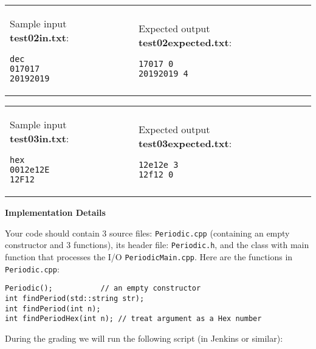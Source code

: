 \documentclass[11pt]{article}
\begin{document}
\vspace{10pt}



\begin{tabular}{@{}ll@{}}
\begin{minipage}[t]{0.49\columnwidth}
Sample input {\bf test02in.txt}:
\begin{verbatim}
dec
017017
20192019
\end{verbatim}
\end{minipage} 
&
\begin{minipage}[t]{0.49\columnwidth}
Expected output {\bf test02expected.txt}:
\begin{verbatim}
17017 0
20192019 4
\end{verbatim}
\end{minipage} 
\end{tabular}

\vspace{10pt}



\begin{tabular}{@{}ll@{}}
\begin{minipage}[t]{0.49\columnwidth}
Sample input {\bf test03in.txt}:
\begin{verbatim}
hex
0012e12E
12F12
\end{verbatim}
\end{minipage} 
&
\begin{minipage}[t]{0.49\columnwidth}
Expected output {\bf test03expected.txt}:
\begin{verbatim}
12e12e 3
12f12 0
\end{verbatim}
\end{minipage} 
\end{tabular}


\vspace{10pt}
{\bf Implementation Details}

Your code should contain $3$ source files: {\tt Periodic.cpp} 
(containing an empty constructor and 3 functions), 
its header file: {\tt Periodic.h}, 
and the class with main function that processes the I/O
{\tt PeriodicMain.cpp}. Here are the functions in {\tt Periodic.cpp}:

\begin{verbatim}
Periodic();           // an empty constructor
int findPeriod(std::string str);
int findPeriod(int n);
int findPeriodHex(int n); // treat argument as a Hex number
\end{verbatim}

During the grading we will run the following script (in Jenkins or similar): 
\end{document}
